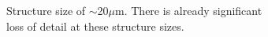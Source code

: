  \begin{figure}[htb]
     \centering
     \begin{subfigure}[t]{0.32\linewidth}
  	\centering
  	\caption{Structure size of $\sim$20$\mu$m. There is already significant loss of detail at these structure sizes.}
  	\label{fig:b2d36_q36}
 \end{subfigure}
\hfill
     \begin{subfigure}[t]{0.32\linewidth}

\end{subfigure}
\end{figure}
